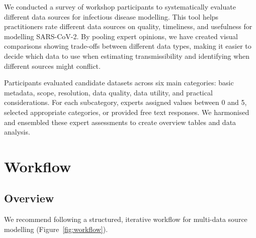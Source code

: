 \documentclass{article}
\begin{document}
We conducted a survey of workshop participants to systematically evaluate different data sources for infectious disease modelling.
This tool helps practitioners rate different data sources on quality, timeliness, and usefulness for modelling SARS-CoV-2.
By pooling expert opinions, we have created visual comparisons showing trade-offs between different data types, making it easier to decide which data to use when estimating transmissibility and identifying when different sources might conflict.

Participants evaluated candidate datasets across six main categories: basic metadata, scope, resolution, data quality, data utility, and practical considerations.
For each subcategory, experts assigned values between 0 and 5, selected appropriate categories, or provided free text responses.
We harmonised and ensembled these expert assessments to create overview tables and data analysis.


\section{Workflow}

\subsection{Overview}

We recommend following a structured, iterative workflow for multi-data source modelling (Figure~\ref{fig:workflow}).
\end{document}
